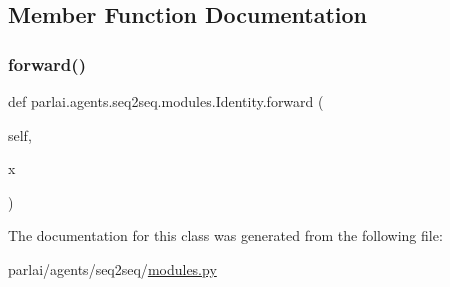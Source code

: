\subsection{Member Function Documentation}
\mbox{\label{classparlai_1_1agents_1_1seq2seq_1_1modules_1_1Identity_ab606c0becf72eba3f6453fd5a551aef3}} 
\subsubsection{\texorpdfstring{forward()}{forward()}}
{\footnotesize\ttfamily def parlai.\+agents.\+seq2seq.\+modules.\+Identity.\+forward (\begin{DoxyParamCaption}\item[{}]{self,  }\item[{}]{x }\end{DoxyParamCaption})}



The documentation for this class was generated from the following file\+:\begin{DoxyCompactItemize}
\item 
parlai/agents/seq2seq/\hyperlink{parlai_2agents_2seq2seq_2modules_8py}{modules.\+py}\end{DoxyCompactItemize}
